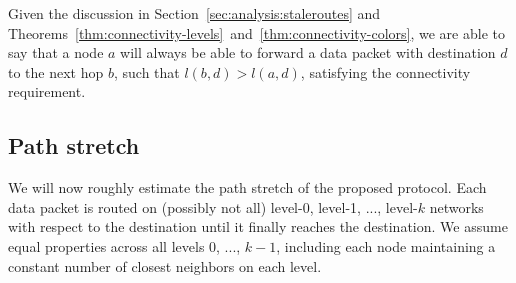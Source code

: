 \documentclass[conference]{IEEEtran}
\theoremstyle{definition}
\begin{document}
Given the discussion in Section~\ref{sec:analysis:staleroutes} and Theorems~\ref{thm:connectivity-levels}~and~\ref{thm:connectivity-colors}, we are able to say that a node $a$ will always be able to forward a data packet with destination $d$ to the next hop $b$, such that $l(b,d) > l(a,d)$, satisfying the connectivity requirement.


\subsection{Path stretch}
\label{sec:analysis:stretch}

We will now roughly estimate the path stretch of the proposed protocol. Each data packet is routed on (possibly not all) level-0, level-1, ..., level-$k$ networks with respect to the destination until it finally reaches the destination. We assume equal properties across all levels 0, ..., $k - 1$, including each node maintaining a constant number of closest neighbors on each level.
\end{document}

